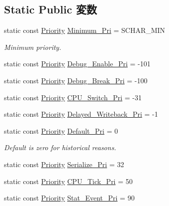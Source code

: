 \subsection*{Static Public 変数}
\begin{DoxyCompactItemize}
\item 
static const \hyperlink{classEventBase_a6d92f7ee8144a5911ed46d85a89a4934}{Priority} \hyperlink{classEventBase_a3a053d2c68a342c1eac8399a161e388f}{Minimum\_\-Pri} = SCHAR\_\-MIN
\begin{DoxyCompactList}\small\item\em Minimum priority. \item\end{DoxyCompactList}\item 
static const \hyperlink{classEventBase_a6d92f7ee8144a5911ed46d85a89a4934}{Priority} \hyperlink{classEventBase_a55b52d71f23a2cf65f4ebfbfe09fef1e}{Debug\_\-Enable\_\-Pri} = -\/101
\item 
static const \hyperlink{classEventBase_a6d92f7ee8144a5911ed46d85a89a4934}{Priority} \hyperlink{classEventBase_a79f47bb016cd59600d9ed498208e1b07}{Debug\_\-Break\_\-Pri} = -\/100
\item 
static const \hyperlink{classEventBase_a6d92f7ee8144a5911ed46d85a89a4934}{Priority} \hyperlink{classEventBase_abd37284b13fd2e86cae48001c8d7b691}{CPU\_\-Switch\_\-Pri} = -\/31
\item 
static const \hyperlink{classEventBase_a6d92f7ee8144a5911ed46d85a89a4934}{Priority} \hyperlink{classEventBase_a9b156fe27a90876b63eead4020c64b10}{Delayed\_\-Writeback\_\-Pri} = -\/1
\item 
static const \hyperlink{classEventBase_a6d92f7ee8144a5911ed46d85a89a4934}{Priority} \hyperlink{classEventBase_a6bd0fef0ad63ee49ad5ece92a9dd5f8f}{Default\_\-Pri} = 0
\begin{DoxyCompactList}\small\item\em Default is zero for historical reasons. \item\end{DoxyCompactList}\item 
static const \hyperlink{classEventBase_a6d92f7ee8144a5911ed46d85a89a4934}{Priority} \hyperlink{classEventBase_aa7968ced91b59b9d8614064d742fb17d}{Serialize\_\-Pri} = 32
\item 
static const \hyperlink{classEventBase_a6d92f7ee8144a5911ed46d85a89a4934}{Priority} \hyperlink{classEventBase_a654adc14d3292be01ccfcfc16cda2e88}{CPU\_\-Tick\_\-Pri} = 50
\item 
static const \hyperlink{classEventBase_a6d92f7ee8144a5911ed46d85a89a4934}{Priority} \hyperlink{classEventBase_aa2e7a615a821276480098db993be1fdd}{Stat\_\-Event\_\-Pri} = 90

\end{DoxyCompactItemize}
